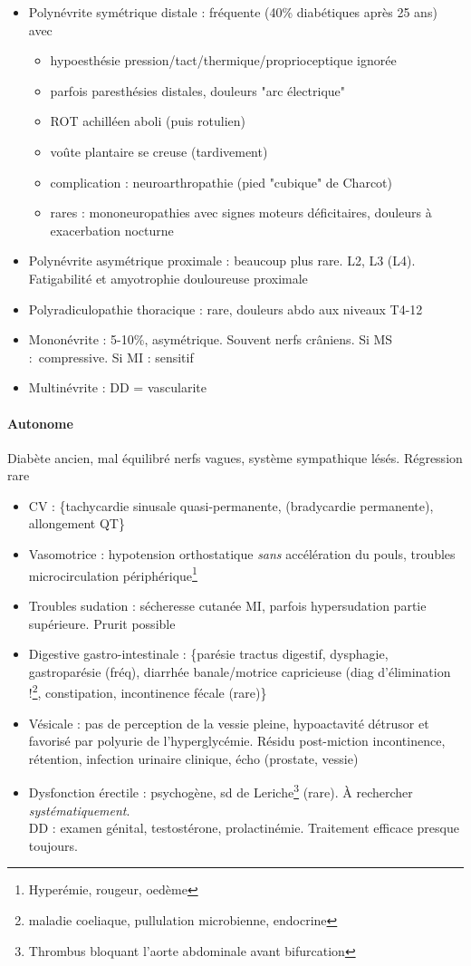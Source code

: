 \documentclass[11pt]{article}
\begin{document}
\begin{itemize}
\item Polynévrite symétrique distale : fréquente (40\% diabétiques après 25 ans) avec
\begin{itemize}
\item hypoesthésie pression/tact/thermique/proprioceptique ignorée
\item parfois paresthésies distales, douleurs "arc électrique"
\item ROT achilléen aboli (puis rotulien)
\item voûte plantaire se creuse (tardivement)
\item complication : neuroarthropathie (pied "cubique" de Charcot)
\item rares : mononeuropathies avec signes moteurs déficitaires, douleurs à
exacerbation nocturne
\end{itemize}
\item Polynévrite asymétrique proximale : beaucoup plus rare. L2, L3
(L4). Fatigabilité et amyotrophie douloureuse proximale
\item Polyradiculopathie thoracique : rare, douleurs abdo aux niveaux T4-12
\item Mononévrite : 5-10\%, asymétrique. Souvent nerfs crâniens. Si MS
: compressive. Si MI : sensitif
\item Multinévrite : DD = vascularite
\end{itemize}

\paragraph{Autonome}
\label{sec:org4ea3b6a}
Diabète ancien, mal équilibré \thus nerfs vagues, système sympathique
lésés. Régression rare

\begin{itemize}
\item CV : \{tachycardie sinusale quasi-permanente, (bradycardie permanente),
allongement QT\}
\item Vasomotrice : hypotension orthostatique \emph{sans} accélération du pouls, troubles
microcirculation périphérique\footnote{Hyperémie, rougeur, oedème}
\item Troubles sudation : sécheresse cutanée MI, parfois hypersudation partie
supérieure. Prurit possible
\item Digestive gastro-intestinale : \{parésie tractus digestif, dysphagie, gastroparésie (fréq), diarrhée banale/motrice capricieuse (diag d'élimination !\footnote{maladie coeliaque, pullulation microbienne, endocrine}, constipation, incontinence fécale (rare)\}
\item Vésicale : pas de perception de la vessie pleine, hypoactavité détrusor et
favorisé par polyurie de l'hyperglycémie. Résidu post-miction \thus
incontinence, rétention, infection urinaire \thus clinique, écho
(prostate, vessie)
\item Dysfonction érectile : psychogène, sd de Leriche\footnote{Thrombus bloquant l'aorte abdominale avant bifurcation} (rare). À rechercher
\emph{systématiquement}. \\
DD : examen génital, testostérone, prolactinémie. Traitement efficace presque toujours.
\end{itemize}
\end{document}
